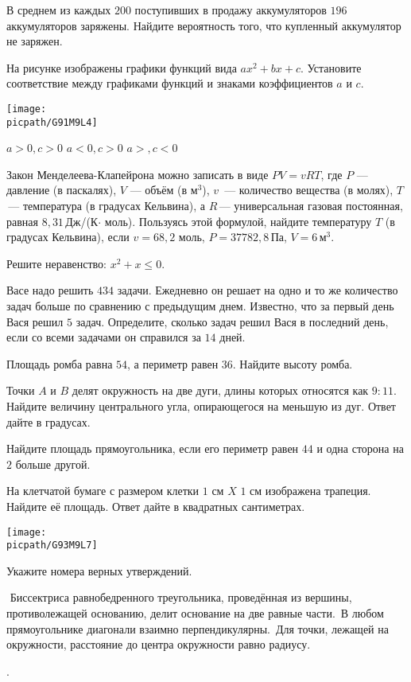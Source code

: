 \begin{class}[number=7]
\begin{listofex}
		\item В среднем из каждых \(200\) поступивших в продажу аккумуляторов \(196\) аккумуляторов заряжены. Найдите вероятность того, что купленный аккумулятор не заряжен.
		\item На рисунке изображены графики функций вида \(ax^2+bx+c\). Установите соответствие между графиками функций и знаками коэффициентов \(a\) и \(c\).
		\begin{center}
			\texttt{[image: \\picpath/G91M9L4]}
		\end{center}
		\begin{tasks}
			\task \( a>0, c>0 \)
			\task \( a<0, c>0 \)
			\task \( a>, c<0 \)
		\end{tasks}
		\item Закон Менделеева-Клапейрона можно записать в виде \(PV=vRT\), где \(P\) --- давление (в паскалях), \(V\) --- объём (в м\(^3\)), \(v\)  --- количество вещества (в молях), \(T\) --- температура (в градусах Кельвина), а \(R\) --- универсальная газовая постоянная, равная \(8,31\) Дж/(К\(\cdot\) моль). Пользуясь этой формулой, найдите температуру \(T\) (в градусах Кельвина), если \(v=68,2\) моль, \(P=37 782,8\) Па, \(V=6\) м\(^3\).
		\item Решите неравенство: \(x^2+x\le0\).
		\item Васе надо решить \(434\) задачи. Ежедневно он решает на одно и то же количество задач больше по сравнению с предыдущим днем. Известно, что за первый день Вася решил \(5\) задач. Определите, сколько задач решил Вася в последний день, если со всеми задачами он справился за \(14\) дней.
		\item Площадь ромба равна \( 54 \), а периметр равен \( 36 \). Найдите высоту ромба.
		\item Точки \(A\) и \(B\) делят окружность на две дуги, длины которых относятся как \(9:11\). Найдите величину центрального угла, опирающегося на меньшую из дуг. Ответ дайте в градусах.
		\item Найдите площадь прямоугольника, если его периметр равен \(44\) и одна сторона на \(2\) больше другой.
		\item На клетчатой бумаге с размером клетки \( 1 \) см \( X \) \( 1 \) см изображена трапеция. Найдите её площадь. Ответ дайте в квадратных сантиметрах.
		\begin{center}
			\texttt{[image: \\picpath/G93M9L7]}
		\end{center}
		\item Укажите номера верных утверждений.
		\begin{tasks}
			\task  Биссектриса равнобедренного треугольника, проведённая из вершины, противолежащей основанию, делит основание на две равные части.
			\task В любом прямоугольнике диагонали взаимно перпендикулярны.
			\task Для точки, лежащей на окружности, расстояние до центра окружности равно радиусу.
		\end{tasks}
	\end{listofex}
\end{class}

\begin{class}[number=8]
	\begin{listofex}
		\item .
	\end{listofex}
\end{class}
